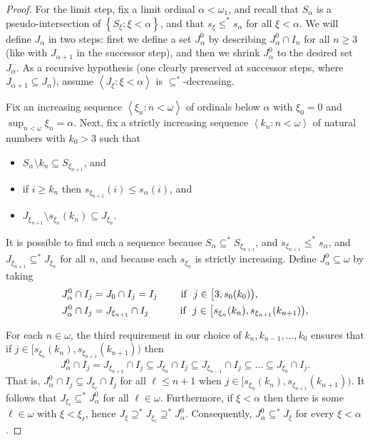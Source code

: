 \documentclass[11pt,leqno]{amsart}
\theoremstyle{definition}
\theoremstyle{remark}
\newcommand{\explicitSet}[1]{\left\lbrace #1 \right\rbrace}
\newcommand{\brackets}[1]{\left\langle #1 \right\rangle}
\newcommand{\set}[2]{\explicitSet{#1 \colon #2}}
\newcommand{\seq}[2]{\brackets{#1 \colon #2}}
\newcommand{\<}{\langle}
\renewcommand{\>}{\rangle}
\renewcommand{\a}{\alpha}
\newcommand{\w}{\omega}
\newcommand{\0}{\emptyset}
\newcommand{\sub}{\subseteq}
\newcommand{\1}{1\hspace{-1.75mm}1}
\begin{document}
\begin{proof}
For the limit step, fix a limit ordinal $\a < \w_1$, and recall that $S_\a$ is a pseudo-intersection of $\set{S_\xi}{\xi < \a}$, and that $s_\xi \leq^* s_\a$ for all $\xi < \a$. 
We will define $J_\a$ in two steps: first we define a set $J^0_\a$ by describing $J^0_\a \cap I_n$ for all $n \geq 3$ (like with $J_{\a+1}$ in the successor step), and then we shrink $J^0_\a$ to the desired set $J_\a$. 
As a recursive hypothesis (one clearly preserved at successor steps, where $J_{\a+1} \sub J_\a$), assume $\seq{J_\xi}{\xi < \a}$ is $\sub^*$-decreasing. 

Fix an increasing sequence $\seq{\xi_n}{n < \w}$ of ordinals below $\a$ with $\xi_0 = 0$ and $\sup_{n < \w}\xi_n = \a$. 
Next, fix a strictly increasing sequence $\seq{k_n}{n < \w}$ of natural numbers with $k_0 > 3$ 
such that 
\begin{itemize}
\item[$\circ$] $S_\a \setminus k_n \sub S_{\xi_{n+1}}$, and 
\item[$\circ$] if $i \geq k_n$ then $s_{\xi_{n+1}}(i) \leq s_\a(i)$, and 
\item[$\circ$] $J_{\xi_{n+1}} \!\setminus s_{\xi_n}(k_n) \sub J_{\xi_n}$. 
\end{itemize}
It is possible to find such a sequence because $S_\a \sub^* S_{\xi_{n+1}}$, and $s_{\xi_{n+1}} \leq^* s_\a$, and $J_{\xi_{n+1}} \sub^* J_{\xi_n}$ for all $n$, and because each $s_{\xi_n}$ is strictly increasing. 
Define $J^0_\a \sub \w$ by taking
\begin{align*}
J^0_\a \cap I_j &= J_0 \cap I_j = I_j \qquad \text{ if } \ j \in \big[ 3,s_0(k_0) \big), \\
J^0_\a \cap I_j &= J_{\xi_{n+1}} \cap I_j \qquad \qquad\hspace{-4.2mm} \text{ if } \ j \in \big[ s_{\xi_n}(k_n),s_{\xi_{n+1}}(k_{n+1}) \big), 
\end{align*}

For each $n \in \w$, the third requirement in our choice of $k_n, k_{n-1}, \dots, k_0$ ensures that if $j \in \big[ s_{\xi_n}(k_n),s_{\xi_{n+1}}(k_{n+1}) \big)$ then 
$$J^0_\a \cap I_j = J_{\xi_{n+1}} \cap I_j \sub J_{\xi_n} \cap I_j \sub J_{\xi_{n-1}} \cap I_j \sub \dots \sub J_{\xi_0} \cap I_j.$$ 
That is, $J^0_\a \cap I_j \sub J_{\xi_\ell} \cap I_j$ for all $\ell \leq n+1$ when $j \in \big[ s_{\xi_n}(k_n),s_{\xi_{n+1}}(k_{n+1}) \big)$. 
It follows that $J_{\xi_\ell} \sub^* J_\a^0$ for all $\ell \in \w$. 
Furthermore, if $\xi < \a$ then there is some $\ell \in \w$ with $\xi < \xi_\ell$, hence $J_\xi \supseteq^* J_{\xi_\ell} \supseteq^* J^0_\a$. Consequently, $J^0_\a \sub^* J_\xi$ for every $\xi < \a$. 


\end{proof}
\end{document}
